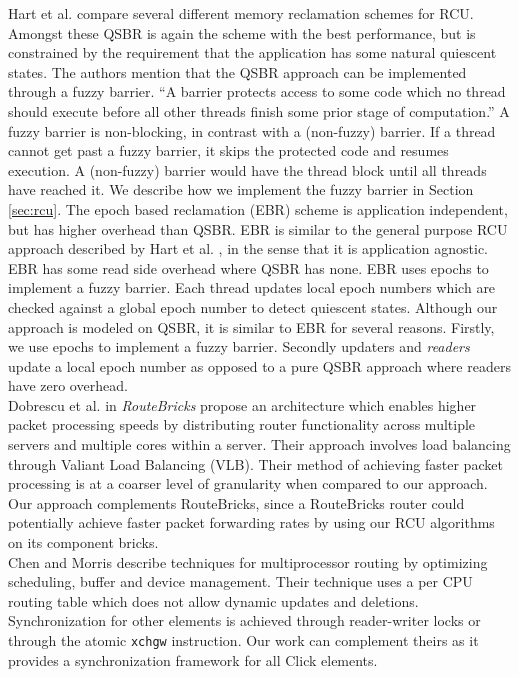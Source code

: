 \documentclass[a4paper]{article}
\begin{document}
Hart et al. \cite{hart} compare several different memory reclamation schemes for RCU. Amongst these QSBR is again the scheme with the best performance, but is constrained by the requirement that the application has some natural quiescent states. The authors mention that the QSBR approach can be implemented through a fuzzy barrier. ``A barrier protects access to some code which no thread should execute before all other threads finish some prior stage of computation.'' A fuzzy barrier is non-blocking, in contrast with a (non-fuzzy) barrier. If a thread cannot get past a fuzzy barrier, it skips the protected code and resumes execution. A (non-fuzzy) barrier would have the thread block until all threads have reached it. We describe how we implement the fuzzy barrier in Section \ref{sec:rcu}. The epoch based reclamation (EBR) scheme is application independent, but has higher overhead than QSBR. EBR is similar to the general purpose RCU approach described by Hart et al. \cite{urcu}, in the sense that it is application agnostic. EBR has some read side overhead where QSBR has none. EBR uses epochs to implement a fuzzy barrier. Each thread updates local epoch numbers which are checked against a global epoch number to detect quiescent states. Although our approach is modeled on QSBR, it is similar to EBR for several reasons. Firstly, we use epochs to implement a fuzzy barrier. Secondly updaters and \emph{readers} update a local epoch number as opposed to a pure QSBR approach where readers have zero overhead.\\

Dobrescu et al. \cite{routebricks} in \emph{RouteBricks} propose an architecture which enables higher packet processing speeds by distributing router functionality across multiple servers and multiple cores within a server. Their approach involves load balancing through Valiant Load Balancing (VLB). Their method of achieving faster packet processing is at a coarser level of granularity when compared to our approach. Our approach complements RouteBricks, since a RouteBricks router could potentially achieve faster packet forwarding rates by using our RCU algorithms on its component bricks.\\

Chen and Morris \cite{chenmorris} describe techniques for multiprocessor routing by optimizing scheduling, buffer and device management. Their technique uses a per CPU routing table which does not allow dynamic updates and deletions. Synchronization for other elements is achieved through reader-writer locks or through the atomic \texttt{xchgw} instruction. Our work can complement theirs as it provides a synchronization framework for all Click elements.\\
\end{document}
